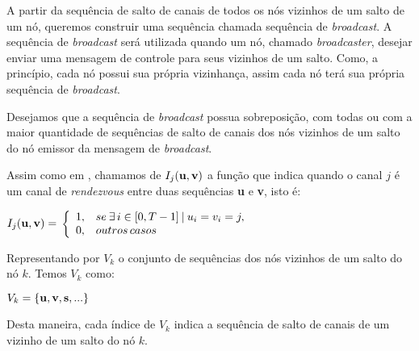 A partir da sequência de salto de canais de todos os nós vizinhos de um salto de um nó, queremos construir uma sequência chamada sequência de {\it broadcast}. A sequência de {\it broadcast} será utilizada quando um nó, chamado {\it broadcaster}, desejar enviar uma mensagem de controle para seus vizinhos de um salto. Como, a princípio, cada nó possui sua própria vizinhança, assim cada nó terá sua própria sequência de {\it broadcast}.

Desejamos que a sequência de {\it broadcast} possua sobreposição, com todas ou com a maior quantidade de sequências de salto de canais dos nós vizinhos de um salto do nó emissor da mensagem de {\it broadcast}. %

Assim como em \cite{quorum}, chamamos de $I_{j}({\bf u},{\bf  v})$ a função que indica quando o canal $j$ é um canal de {\it rendezvous} entre duas sequências {\bf u} e {\bf v}, isto é:



\vspace{0.3cm}
$I_{j}({\bf  u},{\bf  v}) =$ $\left \{
\begin{array}{l l}
1, & se \: \exists \, i \in [0,T-1] \: | \: u_i = v_i = j,\\
0, & outros \, casos
\end{array} \right.$
\vspace{0.3cm}


Representando por $V_{k}$ o conjunto de sequências dos nós vizinhos de um salto do nó $k$. Temos $V_{k}$ como:
\vspace{0.3cm}

$V_{k} = \{{\bf u},{\bf v}, {\bf s} ,...\}$ %



\vspace{0.3cm}

Desta maneira, cada índice de $V_{k}$ indica a sequência de salto de canais de um vizinho de um salto do nó $k$.


